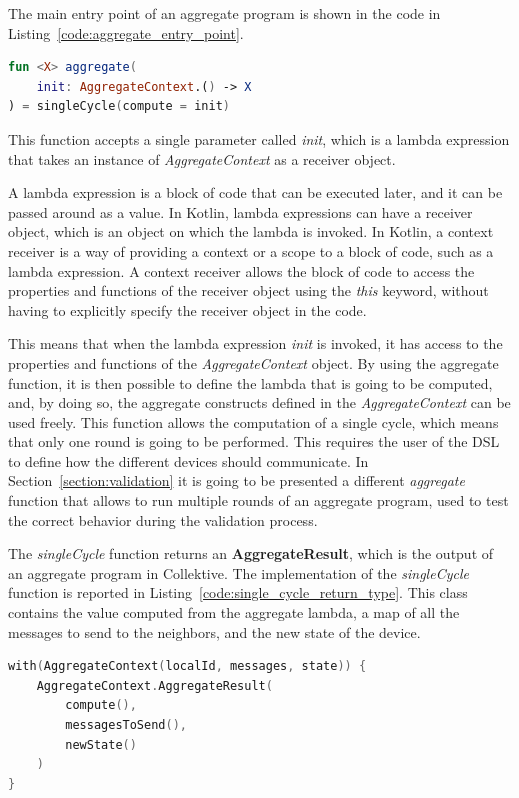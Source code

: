 The main entry point of an aggregate program is shown in the code in Listing~\ref{code:aggregate_entry_point}.
\begin{lstlisting}[caption={Aggregate entry point}, captionpos=b, language=Kotlin, label={code:aggregate_entry_point}]
fun <X> aggregate(
    init: AggregateContext.() -> X
) = singleCycle(compute = init)
\end{lstlisting}
This function accepts a single parameter called \textit{init}, which is a lambda expression that takes an instance of \textit{AggregateContext} as a receiver object.

\begin{info}
    A lambda expression is a block of code that can be executed later, and it can be passed around as a value. In Kotlin, lambda expressions can have a receiver object, which is an object on which the lambda is invoked.\newline
    In Kotlin, a context receiver is a way of providing a context or a scope to a block of code, such as a lambda expression. A context receiver allows the block of code to access the properties and functions of the receiver object using the \textit{this} keyword, without having to explicitly specify the receiver object in the code.
\end{info}

This means that when the lambda expression \textit{init} is invoked, it has access to the properties and functions of the \textit{AggregateContext} object. By using the aggregate function, it is then possible to define the lambda that is going to be computed, and, by doing so, the aggregate constructs defined in the \textit{AggregateContext} can be used freely.\newline
This function allows the computation of a single cycle, which means that only one round is going to be performed. This requires the user of the DSL to define how the different devices should communicate.\newline
In Section~\ref{section:validation} it is going to be presented a different \textit{aggregate} function that allows to run multiple rounds of an aggregate program, used to test the correct behavior during the validation process.

The \textit{singleCycle} function returns an \textbf{AggregateResult}, which is the output of an aggregate program in Collektive. The implementation of the \textit{singleCycle} function is reported in Listing~\ref{code:single_cycle_return_type}. This class contains the value computed from the aggregate lambda, a map of all the messages to send to the neighbors, and the new state of the device.
\begin{lstlisting}[caption={Single cycle \textit{AggregateResult} output}, captionpos=b, language=Kotlin, label={code:single_cycle_return_type}]
with(AggregateContext(localId, messages, state)) {
    AggregateContext.AggregateResult(
        compute(),
        messagesToSend(),
        newState()
    )
}
\end{lstlisting}

